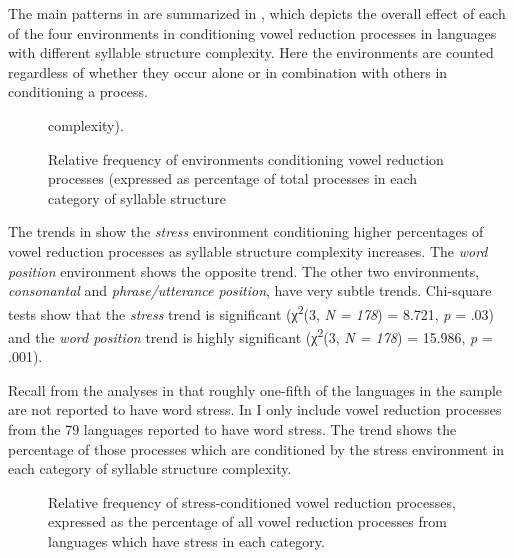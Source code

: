   The main patterns in  are summarized in , which depicts the overall effect of each of the four environments in conditioning vowel reduction processes in languages with different syllable structure complexity. Here the environments are counted regardless of whether they occur alone or in combination with others in conditioning a process.

  
\begin{figure}
\caption{\label{fig:6.2} Relative frequency of environments conditioning vowel reduction processes (expressed as percentage of total processes in each category of syllable structure} complexity).
\end{figure}

  The trends in  show the \textit{stress} environment conditioning higher percentages of vowel reduction processes as syllable structure complexity increases. The \textit{word position} environment shows the opposite trend. The other two environments, \textit{consonantal} and \textit{phrase/utterance position}, have very subtle trends. Chi-square tests show that the \textit{stress} trend is significant (χ\textsuperscript{2}(3, \textit{N = 178}) = 8.721, \textit{p} = .03) and the \textit{word position} trend is highly significant (χ\textsuperscript{2}(3, \textit{N = 178}) = 15.986, \textit{p} = .001).

  Recall from the analyses in  that roughly one-fifth of the languages in the sample are not reported to have word stress. In  I only include vowel reduction processes from the 79 languages reported to have word stress. The trend shows the percentage of those processes which are conditioned by the stress environment in each category of syllable structure complexity.

  
\begin{figure}
\caption{\label{fig:6.3}Relative frequency of stress-conditioned vowel reduction processes, expressed as the percentage of all vowel reduction processes from languages which have stress in each category.}
\end{figure}

